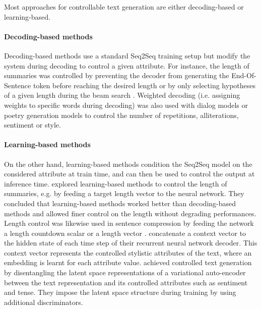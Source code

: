 \documentclass[10pt, a4paper]{article}
\begin{document}
Most approaches for controllable text generation are either decoding-based or learning-based.

\paragraph{Decoding-based methods}
Decoding-based methods use a standard Seq2Seq training setup but modify the system during decoding to control a given attribute. For instance, the length of summaries was controlled by preventing the decoder from generating the End-Of-Sentence token before reaching the desired length or by only selecting hypotheses of a given length during the beam search \cite{kikuchi2016controlling}.
Weighted decoding (i.e. assigning weights to specific words during decoding) was also used with dialog models \cite{see2019makes} or poetry generation models \cite{ghazvininejad2017hafez} to control the number of repetitions, alliterations, sentiment or style.

\paragraph{Learning-based methods}
On the other hand, learning-based methods condition the Seq2Seq model on the considered attribute at train time, and can then be used to control the output at inference time.
 explored learning-based methods to control the length of summaries, e.g. by feeding a target length vector to the neural network.
They concluded that learning-based methods worked better than decoding-based methods and allowed finer control on the length without degrading performances.
Length control was likewise used in sentence compression by feeding the network a length countdown scalar  \cite{fevry2018unsupervised} or a length vector \cite{mallinson2018sentence}.
\cite{ficler2017controlling} concatenate a context vector to the hidden state of each time step of their recurrent neural network decoder.
This context vector represents the controlled stylistic attributes of the text, where an embedding is learnt for each attribute value.
\cite{hu2017toward} achieved controlled text generation by disentangling the latent space representations of a variational auto-encoder between the text representation and its controlled attributes such as sentiment and tense. They impose the latent space structure during training by using additional discriminators.
\end{document}
